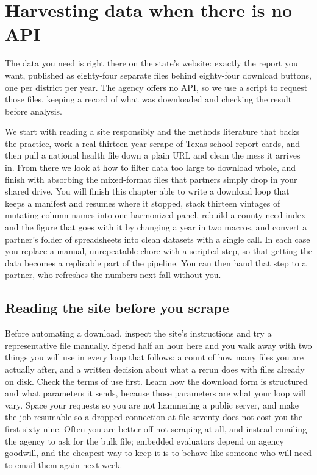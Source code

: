 \chapter{Harvesting data when there is no API}\label{ch:noapi}

The data you need is right there on the state's website: exactly the report you want, published as eighty-four separate files behind eighty-four download buttons, one per district per year. The agency offers no API, so we use a script to request those files, keeping a record of what was downloaded and checking the result before analysis.

We start with reading a site responsibly and the methods literature that backs the practice, work a real thirteen-year scrape of Texas school report cards, and then pull a national health file down a plain URL and clean the mess it arrives in. From there we look at how to filter data too large to download whole, and finish with absorbing the mixed-format files that partners simply drop in your shared drive. You will finish this chapter able to write a download loop that keeps a manifest and resumes where it stopped, stack thirteen vintages of mutating column names into one harmonized panel, rebuild a county need index and the figure that goes with it by changing a year in two macros, and convert a partner's folder of spreadsheets into clean datasets with a single call. In each case you replace a manual, unrepeatable chore with a scripted step, so that getting the data becomes a replicable part of the pipeline. You can then hand that step to a partner, who refreshes the numbers next fall without you.

\section{Reading the site before you scrape}
Before automating a download, inspect the site's instructions and try a representative file manually. Spend half an hour here and you walk away with two things you will use in every loop that follows: a count of how many files you are actually after, and a written decision about what a rerun does with files already on disk. Check the terms of use first. Learn how the download form is structured and what parameters it sends, because those parameters are what your loop will vary. Space your requests so you are not hammering a public server, and make the job resumable so a dropped connection at file seventy does not cost you the first sixty-nine. Often you are better off not scraping at all, and instead emailing the agency to ask for the bulk file; embedded evaluators depend on agency goodwill, and the cheapest way to keep it is to behave like someone who will need to email them again next week.

